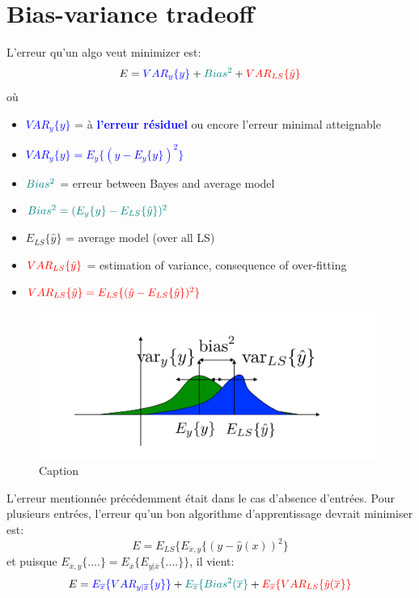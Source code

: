 
\newpage
\section{Bias-variance tradeoff}
L'erreur qu'un algo veut minimizer est: 
$$E = \textcolor{blue}{VAR_y\{y\}} +  \textcolor{teal}{Bias^2} + \textcolor{red}{VAR_{LS}\{\hat y\}}$$
où
\begin{itemize}
    \item \textcolor{blue}{$VAR_y\{y\}$} = à \textcolor{blue}{\textbf{l'erreur résiduel}} ou encore l'erreur minimal atteignable
    \item \textcolor{blue}{$VAR_y\{y\} = E_y\{(y-E_y\{y\})^2\}$}
    \item $\textcolor{teal}{Bias^2}$ = erreur between Bayes and average model
    \item $\textcolor{teal}{Bias^2 =  (E_y\{y\}- E_{LS}\{\hat{y}\})^2}$
    \item $E_{LS}\{\hat{y}\}$ = average model (over all LS)
    \item $\textcolor{red}{VAR_{LS}\{\hat y\}}$ = estimation of variance, consequence of
    over-fitting
    \item $\textcolor{red}{VAR_{LS}\{\hat y\} = E_{LS}\{(\hat{y}-E_{LS}\{\hat{y}\})^2\}}$
\end{itemize}

\begin{figure}[H]
    \centering
    \includegraphics[scale = 0.3]{Question4/bias-variance.png}
    \caption{Caption}
    \label{fig:my_label}
\end{figure}
L'erreur mentionnée précédemment était dans le cas d'absence d'entrées.
Pour plusieurs entrées, l'erreur qu'un bon algorithme d'apprentissage devrait minimiser est:
$$E = E_{LS}\{E_{\overline{x},y}\{(y-\hat{y}(x))^2\}$$
et puisque $ E_{\overline{x},y}\{....\} = E_{\overline{x}}\{E_{y|\overline{x}}\{....\}\}$, il vient: 
$$ E = 
 \textcolor{blue}{E_{\overline{x}}\{VAR_{y|\overline{x}}\{y\}\}}
+ \textcolor{teal}{ E_{\overline{x}}\{Bias^2(\overline{x}\}}
+  \textcolor{red}{ E_{\overline{x}}\{VAR_{LS}\{\hat{y}(\overline{x}\}\} }
$$

